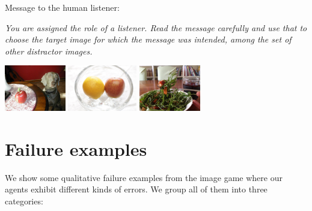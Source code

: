 \documentclass{article}
\begin{document}
\begin{minipage}{0.4\textwidth}
Message to the human listener:

\emph{You are assigned the role of a listener.
Read the message carefully and use that to choose the target image for which the message was intended, among the set of other distractor images.}
\end{minipage}
\qquad
\begin{minipage}{0.5\textwidth}
    \centering
    \includegraphics[width=0.32\linewidth, height=2cm]{figs/sample1.jpeg}
    \includegraphics[width=0.32\linewidth, height=2cm]{figs/sample-target.jpeg}
    \includegraphics[width=0.32\linewidth, height=2cm]{figs/sample2.jpeg}
\end{minipage}

\section{Failure examples}
We show some qualitative failure examples from the image game where our agents exhibit different kinds of errors. We group all of them into three categories:
\end{document}
